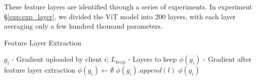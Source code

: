\documentclass[conference]{IEEEtran}
\begin{document}
These feature layers are identified through a series of experiments. In experiment \hyperref[exp:exp_layer]{§\ref{exp:exp_layer}}, we divided the ViT model into 200 layers, with each layer averaging only a few hundred thousand parameters.



\begin{algorithm}
    \caption{Feature Layer Extraction}
    \label{alg:layerExtra}
    \begin{algorithmic}[1]
        \Require $g_i$ - Gradient uploaded by client $i$; $L_{keep}$ - Layers to keep
        \Ensure $\phi(g_i)$ - Gradient after feature layer extraction
            \State $\phi(g_i) \gets \emptyset$
                    \State $\phi(g_i).append(l)$
                \EndIf
            \EndFor
            \State \Return $\phi(g_i)$
        \EndFunction
    \end{algorithmic}
\end{algorithm}
\end{document}

